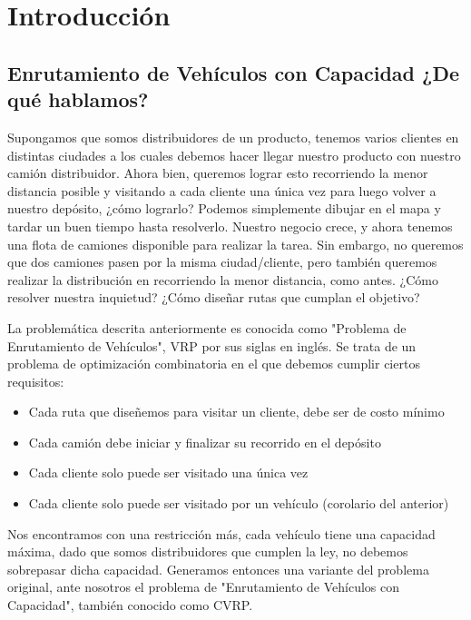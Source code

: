 \section{Introducción}
\subsection{Enrutamiento de Vehículos con Capacidad ¿De qué hablamos?}
Supongamos que somos distribuidores de un producto, tenemos varios clientes en distintas ciudades a los cuales debemos hacer llegar nuestro producto con nuestro camión distribuidor. Ahora bien, queremos lograr esto recorriendo la menor distancia posible y visitando a cada cliente una única vez para luego volver a nuestro depósito, ¿cómo lograrlo? Podemos simplemente dibujar en el mapa y tardar un buen tiempo hasta resolverlo. Nuestro negocio crece, y ahora tenemos una flota de camiones disponible para realizar la tarea. Sin embargo, no queremos que dos camiones pasen por la misma ciudad/cliente, pero también queremos realizar la distribución en recorriendo la menor distancia, como antes. ¿Cómo resolver nuestra inquietud? ¿Cómo diseñar rutas que cumplan el objetivo?

\vskip 8pt

La problemática descrita anteriormente es conocida como "Problema de Enrutamiento de Vehículos", VRP por sus siglas en inglés. Se trata de un problema de optimización combinatoria en el que debemos cumplir ciertos requisitos:

\begin{itemize}
	\item Cada ruta que diseñemos para visitar un cliente, debe ser de costo mínimo
	\item Cada camión debe iniciar y finalizar su recorrido en el depósito
	\item Cada cliente solo puede ser visitado una única vez
	\item Cada cliente solo puede ser visitado por un vehículo (corolario del anterior)
\end{itemize}

\vskip 8pt

Nos encontramos con una restricción más, cada vehículo tiene una capacidad máxima, dado que somos distribuidores que cumplen la ley, no debemos sobrepasar dicha capacidad. Generamos entonces una variante del problema original, ante nosotros el problema de "Enrutamiento de Vehículos con Capacidad", también conocido como CVRP.

\vskip 8pt

